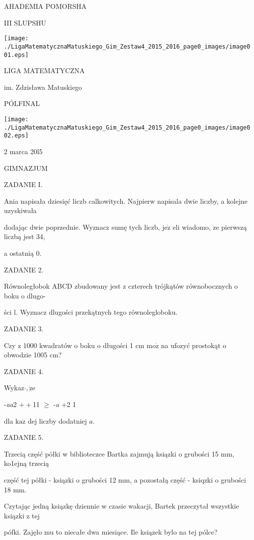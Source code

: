 \documentclass[a4paper,12pt]{article}
\begin{document}
AHADEMIA POMORSHA

III SLUPSHU
\begin{center}
\texttt{[image: ./LigaMatematycznaMatuskiego\_Gim\_Zestaw4\_2015\_2016\_page0\_images/image001.eps]}
\end{center}
LIGA MATEMATYCZNA

im. Zdzisława Matuskiego

PÓLFINAL
\begin{center}
\texttt{[image: ./LigaMatematycznaMatuskiego\_Gim\_Zestaw4\_2015\_2016\_page0\_images/image002.eps]}
\end{center}
2 marca 20l5

GIMNAZJUM

ZADANIE I.

Ania napisała dziesięć liczb calkowitych. Najpierw napisala dwie liczby, a kolejne uzyskiwała

dodając dwie poprzednie. Wyznacz sumę tych liczb, $\mathrm{j}\mathrm{e}\dot{\mathrm{z}}$ eli wiadomo, $\dot{\mathrm{z}}\mathrm{e}$ pierwszą liczbą jest 34,

a ostatnią 0.

ZADANIE 2.

Równoległobok ABCD zbudowany jest z czterech trójkątów równobocznych o boku o dlugo-

ści l. Wyznacz dlugości przekątnych tego równolegloboku.

ZADANIE 3.

Czy z 1000 kwadratów o boku o długości 1 cm $\mathrm{m}\mathrm{o}\dot{\mathrm{z}}$ na ufozyć prostokąt o obwodzie 1005 cm?

ZADANIE 4.

Wykaz$\cdot, \dot{\mathrm{z}}\mathrm{e}$

-{\it aa}2 $++$11 $\geq$ -{\it a} $+$2 1

dla $\mathrm{k}\mathrm{a}\dot{\mathrm{z}}$ dej liczby dodatniej $a.$

ZADANIE 5.

Trzecią część półki w biblioteczce Bartka zajmują ksiązki o grubości 15 mm, ko1ejną trzecią

część tej półki - ksiązki o grubości 12 mm, a pozostałą część - ksiqzki o grubości 18 mm.

Czytając jedną ksiązkę dziennie w czasie wakacji, Bartek przeczytał wszystkie ksiązki z tej

pófki. Zajęło mu to niecałe dwa miesiące. Ile ksiązek bylo na tej pólce?
\end{document}

